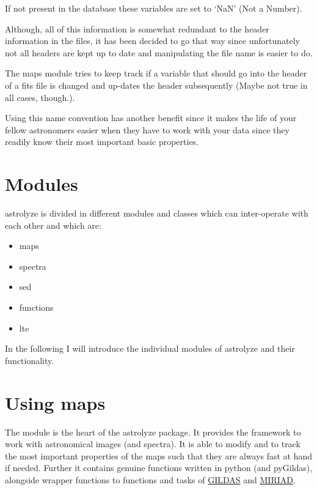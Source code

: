 \documentclass[a4paper,10pt,english]{sphinxmanual}
\begin{document}
If not present in the database these variables are set to `NaN' (Not a Number).

Although, all of this information is somewhat redundant to the header information in
the files, it has been decided to go that way since unfortunately not all
headers are kept up to date and manipulating the file name is easier to do.

The maps module tries to keep track if a variable that should go into the
header of a fits file is changed and up-dates the header subsequently (Maybe
not true in all cases, though.).

Using this name convention has another benefit since it makes the life of your
fellow astronomers easier when they have to work with your data since they
readily know their most important basic properties.


\section{Modules}
\label{manual:modules}
astrolyze is divided in different modules and classes which can inter-operate
with each other and which are:
\begin{itemize}
\item {} 
maps

\item {} 
spectra

\item {} 
sed

\item {} 
functions

\item {} 
lte

\end{itemize}

In the following I will introduce the individual modules of astrolyze and their
functionality.


\section{Using maps}
\label{manual:using-maps}
The  module is the heart of the astrolyze package. It provides the
framework to work with astronomical images (and spectra). It is able to modify
and to track the most important properties of the maps such that they are always
fast at hand if needed. Further it contains genuine functions written in python
(and pyGildas), alongside wrapper functions to functions and tasks of {\hyperref[manual:gildas]{GILDAS}}
and {\hyperref[manual:miriad]{MIRIAD}}.
\end{document}
